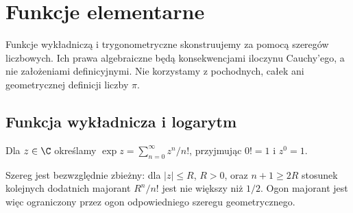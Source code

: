 \chapter{Funkcje elementarne}
\label{ma1:ch:elementary-functions}

Funkcje wykładniczą i trygonometryczne skonstruujemy za pomocą szeregów liczbowych. Ich prawa algebraiczne będą konsekwencjami iloczynu Cauchy'ego, a nie założeniami definicyjnymi. Nie korzystamy z pochodnych, całek ani geometrycznej definicji liczby $\pi$.

\section{Funkcja wykładnicza i logarytm}
\begin{definicja}
\label{ma1:def:exponential-series}
Dla $z\in\C$ określamy $\exp z=\sum_{n=0}^\infty z^n/n!$, przyjmując $0!=1$ i $z^0=1$.
\end{definicja}
Szereg jest bezwzględnie zbieżny: dla $|z|\le R$, $R>0$, oraz $n+1\ge2R$ stosunek kolejnych dodatnich majorant $R^n/n!$ jest nie większy niż $1/2$. Ogon majorant jest więc ograniczony przez ogon odpowiedniego szeregu geometrycznego.

